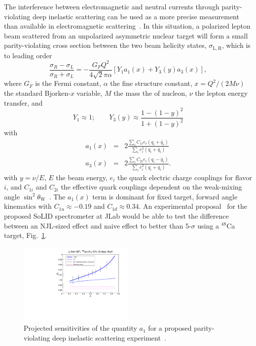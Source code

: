 The interference between electromagnetic and  neutral currents through parity-violating deep inelastic scattering can be used as a more precise measurement than available in electromagnetic scattering~\cite{Cloet:2012td}.  In this situation, a polarized lepton beam scattered from an unpolarized asymmetric nuclear target will form a small parity-violating cross section between the two beam helicity states, $\sigma_{\mathrm{L,R}}$, which is to leading order
\begin{equation}
        \frac{ \sigma_R - \sigma_L }{\sigma_R + \sigma_L} = -\frac{G_F Q^2}{4 \sqrt{2} \pi \alpha} \left[ Y_1 a_1(x) + Y_3(y) a_3(x) \right],
            \label{eq:phy:apv}
\end{equation}
where $G_F$ is the Fermi constant, $\alpha$ the fine structure constant, $x=Q^2/(2M\nu)$ the standard Bjorken-$x$ variable, $M$ the mass the of nucleon, $\nu$ the lepton energy transfer, and
\begin{equation}
        Y_1 \approx 1; \qquad Y_3(y) \approx \frac{1 - (1-y)^2}{1 + (1-y)^2}
    \end{equation}
    with
    \begin{eqnarray}
            a_1(x) & = &  2 \frac{ \sum_i C_{1i} e_i (q_i + \bar{q}_i) }{ \sum_i e_i^2 (q_i + \bar{q}_i) } \\
            a_3(x) & = &  2 \frac{ \sum_i C_{2i} e_i (q_i - \bar{q}_i) }{ \sum_i e_i^2 (q_i + \bar{q}_i) }. 
    \end{eqnarray}
    with $y=\nu/E$,  $E$ the beam energy, $e_i$ the quark electric charge couplings for flavor $i$, and $C_{1i}$ and $C_{2i}$ the effective quark couplings dependent on the weak-mixing angle $\sin^2\theta_\mathrm{W}$~\cite{Patrignani:2016xqp}.  The $a_1(x)$ term is dominant for fixed target, forward angle kinematics with $C_{1u} \approx -0.19$ and $C_{1d} \approx 0.34$.  An experimental proposal~\cite{emcpvdis} for the proposed SoLID spectrometer at JLab would be able to test the difference between an NJL-sized effect and naive effect to better than 5-$\sigma$ using a ${}^{48}$Ca target, Fig.~\ref{fig:ivemc:pvdis}.

    \begin{figure}
        \includegraphics[width=0.5\textwidth]{plots/a1proj_2016.pdf}
        \caption{Projected sensitivities of the quantity $a_1$ for a proposed parity-violating deep inelastic scattering experiment~\cite{emcpvdis}.}
        \label{fig:ivemc:pvdis}
    \end{figure}





